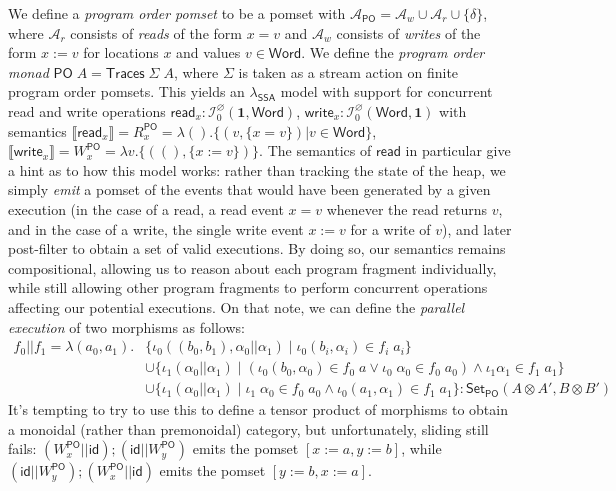 \documentclass[acmsmall,screen,review]{acmart}
\newcommand{\mc}[1]{\ensuremath{\mathcal{#1}}}
\newcommand{\mb}[1]{\ensuremath{\mathbf{#1}}}
\newcommand{\ms}[1]{\ensuremath{\mathsf{#1}}}
\newcommand{\dnt}[1]{\llbracket{#1}\rrbracket}
\newcommand{\isotopessa}{\(\lambda_{\ms{SSA}}\)}
\begin{document}
We define a \emph{program order pomset} to be a pomset with \(\mc{A}_{\ms{PO}} = \mc{A}_w \cup
\mc{A}_r \cup \{\delta\}\), where \(\mc{A}_r\) consists of \textit{reads} of the form \(x = v\) and
\(\mc{A}_w\) consists of \textit{writes} of the form \(x := v\) for locations \(x\) and values \(v
\in \ms{Word}\). We define the \emph{program order monad} \(\ms{PO}\;A = \ms{Traces}\;\Sigma\;A\),
where \(\Sigma\) is taken as a stream action on finite program order pomsets. This yields an
\isotopessa{} model with support for concurrent read and write operations \(\ms{read}_x:
\mc{I}^\varnothing_0(\mb{1}, \ms{Word})\), \(\ms{write}_x: \mc{I}^\varnothing_0(\ms{Word}, \mb{1})\)
with semantics
\(
  \dnt{\ms{read}_x} = R_x^{\ms{PO}} = \lambda (). \{(v, \{x = v\}) | v \in \ms{Word}\}
\),
\(
  \dnt{\ms{write}_x} = W_x^{\ms{PO}} =  \lambda v. \{((), \{x := v\})\}
\).
The semantics of \(\ms{read}\) in particular give a hint as to how this model works: rather than
tracking the state of the heap, we simply \textit{emit} a pomset of the events that would have been
generated by a given execution (in the case of a read, a read event \(x = v\) whenever the read
returns \(v\), and in the case of a write, the single write event \(x := v\) for a write of \(v\)),
and later post-filter to obtain a set of valid executions. By doing so, our semantics remains
compositional, allowing us to reason about each program fragment individually, while still allowing
other program fragments to perform concurrent operations affecting our potential executions. On that
note, we can define the \textit{parallel execution} of two morphisms as follows:
\begin{equation}
  \begin{aligned}
  f_0 || f_1 = \lambda (a_0, a_1). 
  & \{\iota_0 ((b_0, b_1), \alpha_0 || \alpha_1) 
    \mid \iota_0 (b_i, \alpha_i) \in f_i\;a_i\} 
  \\ & \cup \{\iota_1 (\alpha_0 || \alpha_1) 
      \mid (\iota_0 (b_0, \alpha_0) \in f_0\;a \lor \iota_0\;\alpha_0 \in f_0\;a_0) 
      \land \iota_1 \alpha_1 \in f_1\;a_1\} 
  \\ & \cup \{\iota_1 (\alpha_0 || \alpha_1) 
      \mid \iota_1\;\alpha_0 \in f_0\;a_0 
      \land \iota_0 (a_1, \alpha_1) \in f_1\;a_1\}
    : \ms{Set}_{\ms{PO}}(A \otimes A', B \otimes B')
  \end{aligned}
\end{equation}
It's tempting to try to use this to define a tensor product of morphisms to obtain a monoidal
(rather than premonoidal) category, but unfortunately, sliding still fails: \((W_x^{\ms{PO}} ||
\ms{id}) ; (\ms{id} || W_y^{\ms{PO}})\) emits the pomset \([x := a, y := b]\), while \((\ms{id} ||
W_y^{\ms{PO}}) ; (W_x^{\ms{PO}} || \ms{id})\) emits the pomset \([y := b, x := a]\). 
\end{document}
